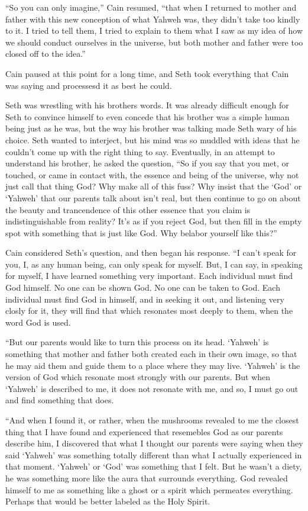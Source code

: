 \documentclass[12pt,twoside,titlepage]{report}
\begin{document}
``So you can only imagine,'' Cain resumed, ``that when I returned to
mother and father with this new conception of what Yahweh was, they
didn't take too kindly to it. I tried to tell them, I tried to explain
to them what I saw as my idea of how we should conduct ourselves in the
universe, but both mother and father were too closed off to the idea.''

Cain paused at this point for a long time, and Seth took everything that
Cain was saying and processesd it as best he could.

Seth was wrestling with his brothers words. It was already difficult
enough for Seth to convince himself to even concede that his brother was
a simple human being just as he was, but the way his brother was talking
made Seth wary of his choice. Seth wanted to interject, but his mind was
so muddled with ideas that he couldn't come up with the right thing to
say. Eventually, in an attempt to understand his brother, he asked the
question, ``So if you say that you met, or touched, or came in contact
with, the essence and being of the universe, why not just call that
thing God? Why make all of this fuss? Why insist that the `God' or
`Yahweh' that our parents talk about isn't real, but then continue to go
on about the beauty and trancendence of this other essence that you
claim is indistinguishable from reality? It's as if you reject God, but
then fill in the empty spot with something that is just like God. Why
belabor yourself like this?''

Cain considered Seth's question, and then began his response. ``I can't
speak for you, I, as any human being, can only speak for myself. But, I
can say, in speaking for myself, I have learned something very
important. Each individual must find God himself. No one can be shown
God. No one can be taken to God. Each individual must find God in
himself, and in seeking it out, and listening very closly for it, they
will find that which resonates most deeply to them, when the word God is
used.

``But our parents would like to turn this process on its head. `Yahweh'
is something that mother and father both created each in their own
image, so that he may aid them and guide them to a place where they may
live. `Yahweh' is the version of God which resonate most strongly with
our parents. But when `Yahweh' is described to me, it does not resonate
with me, and so, I must go out and find something that does.

``And when I found it, or rather, when the mushrooms revealed to me the
closest thing that I have found and experienced that resemebles God as
our parents describe him, I discovered that what I thought our parents
were saying when they said `Yahweh' was something totally different than
what I actually experienced in that moment. `Yahweh' or `God' was
something that I felt. But he wasn't a diety, he was something more like
the aura that surrounds everything. God revealed himself to me as
something like a ghost or a spirit which permeates everything. Perhaps
that would be better labeled as the Holy Spirit.
\end{document}
